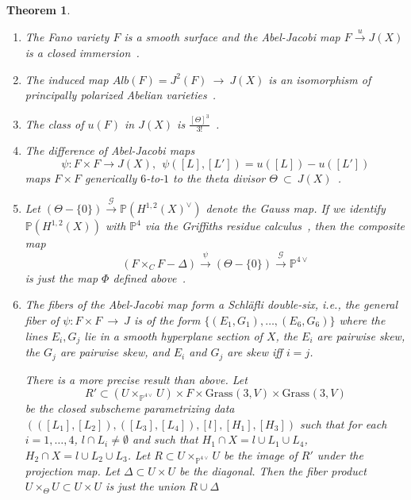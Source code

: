 \documentclass[twoside,12pt,reqno]{amsart}
\theoremstyle{plain}
\newtheorem{thm}{Theorem}[section]
\theoremstyle{definition}
\newcommand{\PP}{\mathbb{P}}
\newcommand{\GR}[3]{\text{Grass}_{#1}(#2,#3)}
\def\ps{\vspace{4pt}}
\newcommand{\lt}{\left}
\newcommand{\rt}{\right}
\newlength{\extraitemseplength}
\newcommand{\extraitemsep}{\rule[-\extraitemseplength]{0cm}{\extraitemseplength}}
\renewcommand{\xrightarrow}[1]{\mathbin{\stackrel{#1}{\longrightarrow}}}
\begin{document}
\ps

\begin{thm} \label{thm-cg} \ \\
\begin{enumerate} 

\item The Fano variety $F$ is a smooth surface and the 
Abel-Jacobi
map $F\xrightarrow{u} J(X)$ is a closed immersion~\cite[theorem 7.8,
theorem 12.37]{CG}. 
\extraitemsep

\item The induced map $Alb(F)=J^2(F)~\rightarrow~ J(X)$ is an isomorphism of 
principally polarized Abelian varieties~\cite[theorem 11.19]{CG}.
\extraitemsep

\item The class of $u(F)$ in $J(X)$
is $\frac{[\Theta]^3}{3!}$~\cite[proposition 13.1]{CG}.
\extraitemsep

\item The difference of 
Abel-Jacobi maps 
\begin{equation}
\psi:F\times F \rightarrow J(X), \ \ \psi([L],[L']) = u([L]) - u([L'])
\end{equation}
maps $F\times F$ generically $6$-to-$1$ to the theta divisor
$\Theta~\subset ~J(X)$~\cite[section 13]{CG}.
\extraitemsep

\item Let $(\Theta-\{0\}) \xrightarrow{\mathcal{G}} 
\PP(H^{1,2}(X)^\vee)$ denote the Gauss map.  If we identify
$\PP(H^{1,2}(X))$ with $\PP^4$ via the
Griffiths residue calculus~\cite{GR}, then the composite map
\begin{equation}
(F\times_C F-\Delta)\xrightarrow{\psi}(\Theta -\{0\})\xrightarrow{\mathcal{G}}
\PP^{4\vee}
\end{equation}
is just the map $\Phi$ defined above~\cite[formula 13.6]{CG}.
\extraitemsep

\item The fibers of the Abel-Jacobi map form a \emph{ Schl\"afli
double-six}, i.e., the general fiber of $\psi:F\times F~\rightarrow~ J$
is of the form $\{(E_1,G_1),\dots,(E_6,G_6)\}$ where the lines
$E_i,G_j$ lie in a smooth hyperplane section of $X$, the $E_i$ are
pairwise skew, the $G_j$ are pairwise skew, and $E_i$ and $G_j$ are
skew iff $i=j$.  

There is a more precise result than above.  Let 
\begin{equation}R' \subset \lt(U\times_{\PP^{4\vee}} U\rt) \times F \times
\GR{}{3}{V}\times \GR{}{3}{V}\end{equation} 
be the closed subscheme parametrizing data
$\lt(\lt([L_1],[L_2]\rt),\lt([L_3],[L_4]\rt),[l], [H_1], [H_3]\rt)$
such that for each $i=1,\dots,4$, $l\cap L_i\neq\emptyset$ and such
that $H_1\cap X = l\cup L_1\cup L_4$, $H_2\cap X = l\cup L_2\cup L_3$.
Let $R\subset U\times_{\PP^{4\vee}} U$ be the image of $R'$ under the
projection map.  Let $\Delta\subset U\times U$ be the diagonal.  Then
the fiber product $U\times_\Theta U\subset U\times U$ is just the
union $R\cup\Delta$~\cite[p. 347-348]{CG}
\extraitemsep


\end{enumerate}
\end{thm}
\end{document}
